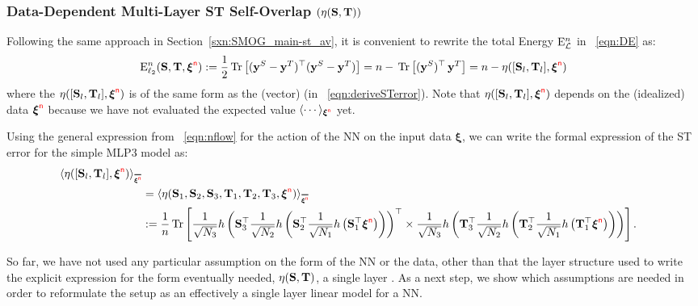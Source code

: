 \subsubsection{Data-Dependent Multi-Layer ST Self-Overlap \texorpdfstring{$(\eta({\mathbf{S}},{\mathbf{T}}))$}{ETA(S, T)}}

Following the same approach in Section~\ref{sxn:SMOG_main-st_av}, it is convenient to rewrite the total Energy $\mathbf{\mathrm{E}}^{n}_{\mathcal{L}}$ in \EQN~\ref{eqn:DE} as:
\begin{align}
\label{eqn:DE2}
\mathbf{\mathrm{E}}^{n}_{\ell_2}({\mathbf{S}},{\mathbf{T}}, \boldsymbol{\xi}^{{\color{red}\sf{n}}})
   := \frac{1}{2} \mbox{}\operatorname{Tr}\left[ (\mathbf{y}^{S} - \mathbf{y}^{T})^\top (\mathbf{y}^{S} - \mathbf{y}^{T}) \right]
   = n - \mbox{}\operatorname{Tr}\left[ (\mathbf{y}^{S})^{\top} \, \mathbf{y}^{T}  \right]
   = n - \eta([{\mathbf{S}}_l,{\mathbf{T}}_l],\boldsymbol{\xi}^{{\color{red}\sf{n}}})
\end{align}
where the \SelfOverlap $\eta([{\mathbf{S}}_l,{\mathbf{T}}_l],\boldsymbol{\xi}^{{\color{red}\sf{n}}})$
is of the same form as the (vector) \LinearPerceptron (in \EQN~\ref{eqn:deriveSTerror}).
Note that $\eta([{\mathbf{S}}_l,{\mathbf{T}}_l],\boldsymbol{\xi}^{{\color{red}\sf{n}}})$ depends on the (idealized) data $\boldsymbol{\xi}^{{\color{red}\sf{n}}}$
because we have not evaluated the expected value $\langle \cdots \rangle_{\boldsymbol{\xi}^{{\color{red}\sf{n}}}}$ yet.

Using the general expression from \EQN~\ref{eqn:nflow} for the action of the NN on the input data $\boldsymbol{\xi}$,
we can write the formal expression of the ST error for the simple MLP3 model as:
\begin{align}
\label{eqn:overlap1}
\ETAMLPAVG  \\ \nonumber
& =\langle\ETA(\SMAT_1,\SMAT_2,\SMAT_3,\TMAT_1,\TMAT_2,\TMAT_3,\NDXI)\rangle_{\AVGNDXI}  \\ \nonumber
& :=  \frac{1}{\ND}\Trace{
    \frac{1}{\sqrt{N_3}} h\left(\SMAT_3^{\top} 
    \frac{1}{\sqrt{N_2}} h\left(\SMAT_2^{\top} 
    \frac{1}{\sqrt{N_1}} h\left(\SMAT_1^{\top} \NDXI \right)\right)\right)^{\top} 
    \times
    \frac{1}{\sqrt{N_3}} h\left(\TMAT_3^{\top} 
    \frac{1}{\sqrt{N_2}} h\left(\TMAT_2^{\top} 
    \frac{1}{\sqrt{N_1}} h\left(\TMAT_1^{\top} \NDXI \right)\right)\right)
  }.
\end{align}

So far, we have not used any particular assumption on the form of the NN or the data, 
other than that the layer structure used to write the explicit expression for the form eventually needed,
$\eta({\mathbf{S}},{\mathbf{T}})$, a single layer \SelfOverlap.
As a next step, we show which assumptions are needed in order to reformulate the setup as
an effectively a single layer linear model for a NN.

